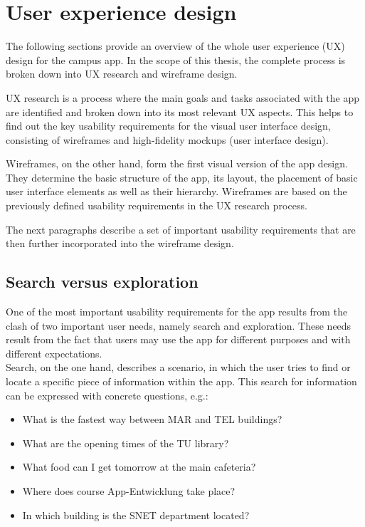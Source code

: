 \section{User experience design}
The following sections provide an overview of the whole user experience (UX) design for the campus app. In the scope of this thesis, the complete process is broken down into UX research and wireframe design.

UX research is a process where the main goals and tasks associated with the app are identified and broken down into its most relevant UX aspects. This helps to find out the key usability requirements for the visual user interface design, consisting of wireframes and high-fidelity mockups (user interface design).

Wireframes, on the other hand, form the first visual version of the app design. They determine the basic structure of the app, its layout, the placement of basic user interface elements as well as their hierarchy. Wireframes are based on the previously defined usability requirements in the UX research process.

The next paragraphs describe a set of important usability requirements that are then further incorporated into the wireframe design.

\subsection{Search versus exploration}
One of the most important usability requirements for the app results from the clash of two important user needs, namely search and exploration. These needs result from the fact that users may use the app for different purposes and with different expectations.\\

Search, on the one hand, describes a scenario, in which the user tries to find or locate a specific piece of information within the app. This search for information can be expressed with concrete questions, e.g.:

\begin{itemize}
    \item What is the fastest way between MAR and TEL buildings?
    \item What are the opening times of the TU library?
    \item What food can I get tomorrow at the main cafeteria?
    \item Where does course App-Entwicklung take place?
    \item In which building is the SNET department located?
\end{itemize}

